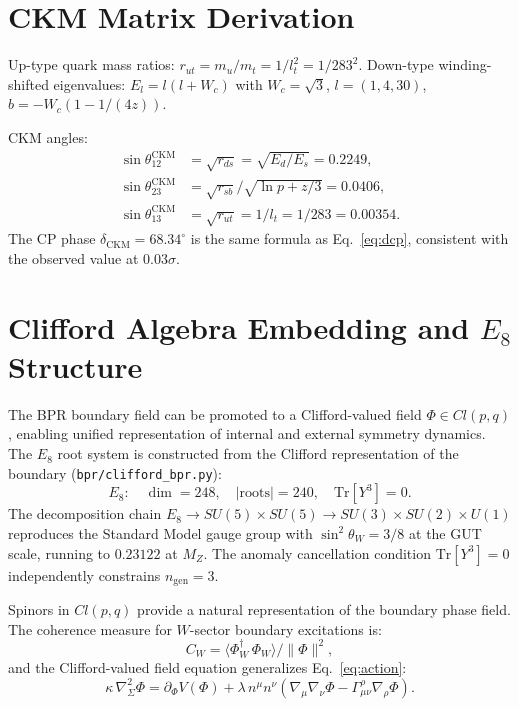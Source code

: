 \documentclass[aps,prd,twocolumn,superscriptaddress,longbibliography,nofootinbib]{revtex4-2}
\newcommand{\sinW}{\sin^2\!\theta_W}
\newcommand{\MZ}{M_Z}
\begin{document}
\section{CKM Matrix Derivation}
\label{app:ckm}

Up-type quark mass ratios: $r_{ut} = m_u/m_t = 1/l_t^2 = 1/283^2$.
Down-type winding-shifted eigenvalues: $E_l = l(l + W_c)$ with
$W_c = \sqrt{3}$, $l = (1, 4, 30)$, $b = -W_c(1 - 1/(4z))$.

CKM angles:
\begin{align}
\sin\theta_{12}^{\mathrm{CKM}} &= \sqrt{r_{ds}} = \sqrt{E_d/E_s} = 0.2249, \\
\sin\theta_{23}^{\mathrm{CKM}} &= \sqrt{r_{sb}} / \sqrt{\ln p + z/3} = 0.0406, \\
\sin\theta_{13}^{\mathrm{CKM}} &= \sqrt{r_{ut}} = 1/l_t = 1/283 = 0.00354.
\end{align}
The CP phase $\delta_{\mathrm{CKM}} = 68.34^\circ$ is the same formula
as Eq.~\eqref{eq:dcp}, consistent with the observed value at $0.03\sigma$.

\section{Clifford Algebra Embedding and $E_8$ Structure}
\label{app:clifford}

The BPR boundary field can be promoted to a Clifford-valued field
$\Phi \in Cl(p,q)$, enabling unified representation of internal and
external symmetry dynamics.  The $E_8$ root system is constructed from
the Clifford representation of the boundary
(\texttt{bpr/clifford\_bpr.py}):
\begin{equation}
E_8:\quad \dim = 248,\quad |\mathrm{roots}| = 240,\quad
\mathrm{Tr}[Y^3] = 0.
\end{equation}
The decomposition chain
$E_8 \to SU(5)\times SU(5) \to SU(3)\times SU(2)\times U(1)$
reproduces the Standard Model gauge group with $\sinW = 3/8$ at the GUT
scale, running to $0.23122$ at $\MZ$.  The anomaly cancellation condition
$\mathrm{Tr}[Y^3] = 0$ independently constrains $n_{\mathrm{gen}} = 3$.

Spinors in $Cl(p,q)$ provide a natural representation of the boundary
phase field.  The coherence measure for $W$-sector boundary excitations is:
\begin{equation}
C_W = \langle\Phi_W^\dagger\,\Phi_W\rangle / \|\Phi\|^2,
\end{equation}
and the Clifford-valued field equation generalizes Eq.~\eqref{eq:action}:
\begin{equation}
\kappa\,\nabla^2_\Sigma\Phi
= \partial_\Phi V(\Phi) + \lambda\,n^\mu n^\nu
  (\nabla_\mu\nabla_\nu\Phi - \Gamma^\rho_{\mu\nu}\nabla_\rho\Phi).
\end{equation}
\end{document}
